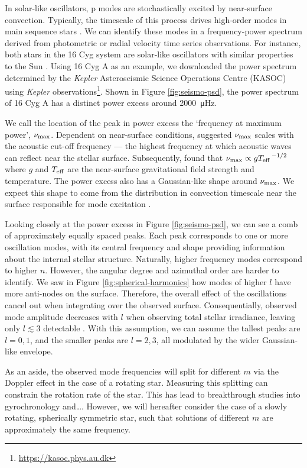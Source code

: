 In solar-like oscillators, p modes are stochastically excited by near-surface convection. Typically, the timescale of this process drives high-order modes in main sequence stars \needcite[\(n \sim 20\)]. We can identify these modes in a frequency-power spectrum derived from photometric or radial velocity time series observations. For instance, both stars in the 16 Cyg system are solar-like oscillators with similar properties to the Sun \needcite. Using 16 Cyg A as an example, we downloaded the power spectrum determined by the \emph{Kepler} Asteroseismic Science Operations Centre (KASOC) using \emph{Kepler} observations\footnote{\url{https://kasoc.phys.au.dk}}. Shown in Figure \ref{fig:seismo-psd}, the power spectrum of 16 Cyg A has a distinct power excess around \SI{2000}{\micro\hertz}. 

We call the location of the peak in power excess the `frequency at maximum power', \({\nu_\mathrm{max}}\). Dependent on near-surface conditions, \citet{Brown.Gilliland.ea1991} suggested \({\nu_\mathrm{max}}\) scales with the acoustic cut-off frequency --- the highest frequency at which acoustic waves can reflect near the stellar surface. Subsequently, \citet{Kjeldsen.Bedding1995} found that \({\nu_\mathrm{max}} \propto g{T_\mathrm{eff}}^{\,-1/2}\) where \(g\) and \({T_\mathrm{eff}}\) are the near-surface gravitational field strength and temperature. The power excess also has a Gaussian-like shape around \({\nu_\mathrm{max}}\). We expect this shape to come from the distribution in convection timescale near the surface responsible for mode excitation \needcite.

Looking closely at the power excess in Figure \ref{fig:seismo-psd}, we can see a comb of approximately equally spaced peaks. Each peak corresponds to one or more oscillation modes, with its central frequency and shape providing information about the internal stellar structure. Naturally, higher frequency modes correspond to higher \(n\). However, the angular degree and azimuthal order are harder to identify. We saw in Figure \ref{fig:spherical-harmonics} how modes of higher \(l\) have more anti-nodes on the surface. Therefore, the overall effect of the oscillations cancel out when integrating over the observed surface. Consequentially, observed mode amplitude decreases with \(l\) when observing total stellar irradiance, leaving only \(l \lesssim 3\) detectable \needcite. With this assumption, we can assume the tallest peaks are \(l=0,1\), and the smaller peaks are \(l=2,3\), all modulated by the wider Gaussian-like envelope.

As an aside, the observed mode frequencies will split for different \(m\) via the Doppler effect in the case of a rotating star. Measuring this splitting can constrain the rotation rate of the star. This has lead to breakthrough studies into gyrochronology and\dots \citep[e.g.][]{Hall.Davies.ea2021}. However, we will hereafter consider the case of a slowly rotating, spherically symmetric star, such that solutions of different \(m\) are approximately the same frequency.

